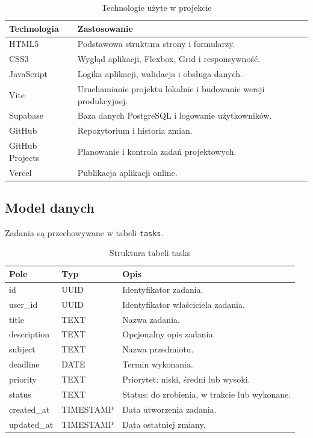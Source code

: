 \documentclass[12pt,a4paper]{article}
\begin{document}
\begin{table}[H]
\centering
\begin{tabularx}{\textwidth}{|p{3.5cm}|X|}
\hline
\textbf{Technologia} &
\textbf{Zastosowanie} \\
\hline
HTML5 & Podstawowa struktura strony i formularzy. \\
\hline
CSS3 & Wygląd aplikacji, Flexbox, Grid i responsywność. \\
\hline
JavaScript & Logika aplikacji, walidacja i obsługa danych. \\
\hline
Vite & Uruchamianie projektu lokalnie i budowanie wersji produkcyjnej. \\
\hline
Supabase & Baza danych PostgreSQL i logowanie użytkowników. \\
\hline
GitHub & Repozytorium i historia zmian. \\
\hline
GitHub Projects & Planowanie i kontrola zadań projektowych. \\
\hline
Vercel & Publikacja aplikacji online. \\
\hline
\end{tabularx}
\caption{Technologie użyte w projekcie}
\end{table}

\subsection{Model danych}

Zadania są przechowywane w tabeli \texttt{tasks}.

\begin{table}[H]
\centering
\begin{tabularx}{\textwidth}{|p{3cm}|p{2.8cm}|X|}
\hline
\textbf{Pole} &
\textbf{Typ} &
\textbf{Opis} \\
\hline
id & UUID & Identyfikator zadania. \\
\hline
user\_id & UUID & Identyfikator właściciela zadania. \\
\hline
title & TEXT & Nazwa zadania. \\
\hline
description & TEXT & Opcjonalny opis zadania. \\
\hline
subject & TEXT & Nazwa przedmiotu. \\
\hline
deadline & DATE & Termin wykonania. \\
\hline
priority & TEXT & Priorytet: niski, średni lub wysoki. \\
\hline
status & TEXT & Status: do zrobienia, w trakcie lub wykonane. \\
\hline
created\_at & TIMESTAMP & Data utworzenia zadania. \\
\hline
updated\_at & TIMESTAMP & Data ostatniej zmiany. \\
\hline
\end{tabularx}
\caption{Struktura tabeli tasks}
\end{table}
\end{document}
